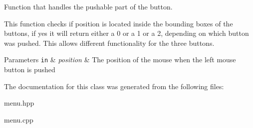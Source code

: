 Function that handles the pushable part of the button. 

This function checks if position is located inside the bounding boxes of the buttons, if yes it will return either a 0 or a 1 or a 2, depending on which button was pushed. This allows different functionality for the three buttons.


\begin{DoxyParams}[1]{Parameters}
\mbox{\tt in}  & {\em position} & The position of the mouse when the left mouse button is pushed \\
\hline
\end{DoxyParams}


The documentation for this class was generated from the following files\+:\begin{DoxyCompactItemize}
\item 
menu.\+hpp\item 
menu.\+cpp\end{DoxyCompactItemize}
